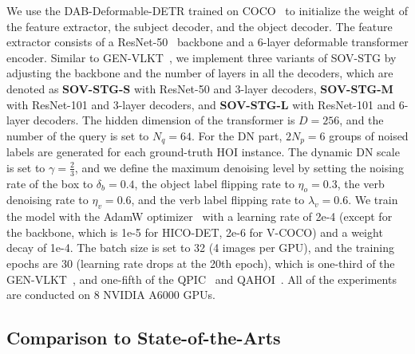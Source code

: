 \documentclass[10pt,twocolumn,letterpaper]{article}
\begin{document}
\quad We use the DAB-Deformable-DETR trained on COCO~\cite{lin2014microsoft} to initialize the weight of the feature extractor, the subject decoder, and the object decoder.
The feature extractor consists of a ResNet-50~\cite{he2016deep} backbone and a 6-layer deformable transformer encoder.
Similar to GEN-VLKT~\cite{liao2022gen}, we implement three variants of SOV-STG by adjusting the backbone and the number of layers in all the decoders, which are denoted as \textbf{SOV-STG-S} with ResNet-50 and 3-layer decoders, \textbf{SOV-STG-M} with ResNet-101 and 3-layer decoders, and \textbf{SOV-STG-L} with ResNet-101 and 6-layer decoders.
The hidden dimension of the transformer is $D=256$, and the number of the query is set to $N_q=64$.
For the DN part, $2N_p=6$ groups of noised labels are generated for each ground-truth HOI instance.
The dynamic DN scale is set to $\gamma=\frac{2}{3}$, and we define the maximum denoising level by setting the noising rate of the box to $\delta_b = 0.4$, the object label flipping rate to $\eta_o = 0.3$, the verb denoising rate to $\eta_v = 0.6$, and the verb label flipping rate to $\lambda_v = 0.6$.
We train the model with the AdamW optimizer~\cite{loshchilov2018decoupled} with a learning rate of 2e-4 (except for the backbone, which is 1e-5 for HICO-DET, 2e-6 for V-COCO) and a weight decay of 1e-4.
The batch size is set to 32 (4 images per GPU), and the training epochs are 30 (learning rate drops at the 20th epoch), which is one-third of the GEN-VLKT~\cite{liao2022gen}, and one-fifth of the QPIC~\cite{tamura2021qpic} and QAHOI~\cite{cjw_qahoi}.
All of the experiments are conducted on 8 NVIDIA A6000 GPUs.

\subsection{Comparison to State-of-the-Arts}
\end{document}
